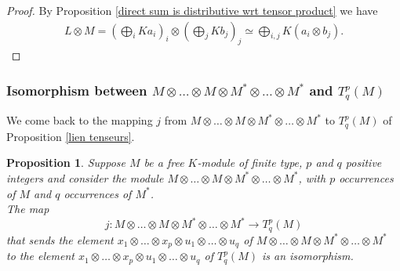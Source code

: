 \documentclass{report}
\newtheorem{prop}{Proposition}
\theoremstyle{definition}
\theoremstyle{remark}
\begin{document}
\begin{proof}
    By Proposition \ref{direct sum is distributive wrt tensor product} we have 
    \begin{equation*}
        \begin{split}
            L \otimes M = (\bigoplus_i K a_i)_i \otimes (\bigoplus_j K b_j)_j \simeq \bigoplus_{i,j} K (a_i \otimes b_j).
        \end{split}
    \end{equation*}
\end{proof}

\vspace{1,5cm}
\subsubsection{Isomorphism between $M\otimes \dots \otimes M\otimes M^* \otimes \dots \otimes M^*$ and  $T^p_q(M)$}
\bigskip
We come back to the mapping $j$ from $M\otimes \dots \otimes M\otimes M^* \otimes \dots \otimes M^* $ to  $T^p_q(M)$ of Proposition \ref{lien tenseurs}.

\begin{prop}
    Suppose  $M$ be a free $K$-module of finite type, $p$ and $q$ positive integers and consider the module $M\otimes \dots \otimes M\otimes M^* \otimes \dots \otimes M^* $, with $p$ occurrences of $M$ and $q$ occurrences of $M^*$.\\
    The map 
    $$j: M\otimes \dots \otimes M\otimes M^* \otimes \dots \otimes M^*  \to T^p_q(M)$$
    that sends the element $x_1 \otimes\dots \otimes x_p \otimes u_1 \otimes \dots \otimes u_q $ of $ M\otimes \dots \otimes M\otimes M^* \otimes \dots \otimes M^* $\\
    to the element  $x_1 \otimes\dots \otimes x_p \otimes u_1 \otimes \dots \otimes u_q $ of $T^p_q(M)$ 
    is an isomorphism.
\end{prop}
\end{document}
